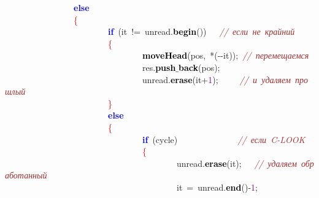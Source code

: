 \mbox{}\ \ \ \ \ \ \ \ \ \ \ \ \ \ \ \ \textbf{\textcolor{Blue}{else}} \\
\mbox{}\ \ \ \ \ \ \ \ \ \ \ \ \ \ \ \ \textcolor{Red}{\{} \\
\mbox{}\ \ \ \ \ \ \ \ \ \ \ \ \ \ \ \ \ \ \ \ \ \ \ \ \textbf{\textcolor{Blue}{if}}\ \textcolor{BrickRed}{(}it\ \textcolor{BrickRed}{!=}\ unread\textcolor{BrickRed}{.}\textbf{\textcolor{Black}{begin}}\textcolor{BrickRed}{())}\ \ \ \textit{\textcolor{Brown}{//\ если\ не\ крайний}} \\
\mbox{}\ \ \ \ \ \ \ \ \ \ \ \ \ \ \ \ \ \ \ \ \ \ \ \ \textcolor{Red}{\{} \\
\mbox{}\ \ \ \ \ \ \ \ \ \ \ \ \ \ \ \ \ \ \ \ \ \ \ \ \ \ \ \ \ \ \ \ \textbf{\textcolor{Black}{moveHead}}\textcolor{BrickRed}{(}pos\textcolor{BrickRed}{,}\ \textcolor{BrickRed}{*(-\/-}it\textcolor{BrickRed}{));}\ \textit{\textcolor{Brown}{//\ перемещаемся}} \\
\mbox{}\ \ \ \ \ \ \ \ \ \ \ \ \ \ \ \ \ \ \ \ \ \ \ \ \ \ \ \ \ \ \ \ res\textcolor{BrickRed}{.}\textbf{\textcolor{Black}{push$\_$back}}\textcolor{BrickRed}{(}pos\textcolor{BrickRed}{);} \\
\mbox{}\ \ \ \ \ \ \ \ \ \ \ \ \ \ \ \ \ \ \ \ \ \ \ \ \ \ \ \ \ \ \ \ unread\textcolor{BrickRed}{.}\textbf{\textcolor{Black}{erase}}\textcolor{BrickRed}{(}it\textcolor{BrickRed}{+}\textcolor{Purple}{1}\textcolor{BrickRed}{);}\ \ \ \ \ \textit{\textcolor{Brown}{//\ и\ удаляем\ прошлый}} \\
\mbox{}\ \ \ \ \ \ \ \ \ \ \ \ \ \ \ \ \ \ \ \ \ \ \ \ \textcolor{Red}{\}} \\
\mbox{}\ \ \ \ \ \ \ \ \ \ \ \ \ \ \ \ \ \ \ \ \ \ \ \ \textbf{\textcolor{Blue}{else}} \\
\mbox{}\ \ \ \ \ \ \ \ \ \ \ \ \ \ \ \ \ \ \ \ \ \ \ \ \textcolor{Red}{\{} \\
\mbox{}\ \ \ \ \ \ \ \ \ \ \ \ \ \ \ \ \ \ \ \ \ \ \ \ \ \ \ \ \ \ \ \ \textbf{\textcolor{Blue}{if}}\ \textcolor{BrickRed}{(}cycle\textcolor{BrickRed}{)}\ \ \ \ \ \ \ \ \ \ \ \ \ \ \textit{\textcolor{Brown}{//\ если\ C-LOOK}} \\
\mbox{}\ \ \ \ \ \ \ \ \ \ \ \ \ \ \ \ \ \ \ \ \ \ \ \ \ \ \ \ \ \ \ \ \textcolor{Red}{\{} \\
\mbox{}\ \ \ \ \ \ \ \ \ \ \ \ \ \ \ \ \ \ \ \ \ \ \ \ \ \ \ \ \ \ \ \ \ \ \ \ \ \ \ \ unread\textcolor{BrickRed}{.}\textbf{\textcolor{Black}{erase}}\textcolor{BrickRed}{(}it\textcolor{BrickRed}{);}\ \ \ \textit{\textcolor{Brown}{//\ удаляем\ обработанный}} \\
\mbox{}\ \ \ \ \ \ \ \ \ \ \ \ \ \ \ \ \ \ \ \ \ \ \ \ \ \ \ \ \ \ \ \ \ \ \ \ \ \ \ \ it\ \textcolor{BrickRed}{=}\ unread\textcolor{BrickRed}{.}\textbf{\textcolor{Black}{end}}\textcolor{BrickRed}{()-}\textcolor{Purple}{1}\textcolor{BrickRed}{;} \\
